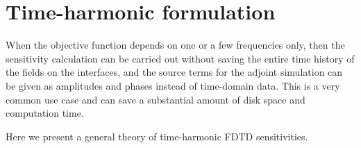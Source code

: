 


\section{Time-harmonic formulation}

When the objective function depends on one or a few frequencies only, then the sensitivity calculation can be carried out without saving the entire time history of the fields on the interfaces, and the source terms for the adjoint simulation can be given as amplitudes and phases instead of time-domain data.  This is a very common use case and can save a substantial amount of disk space and computation time.

Here we present a general theory of time-harmonic FDTD sensitivities.

